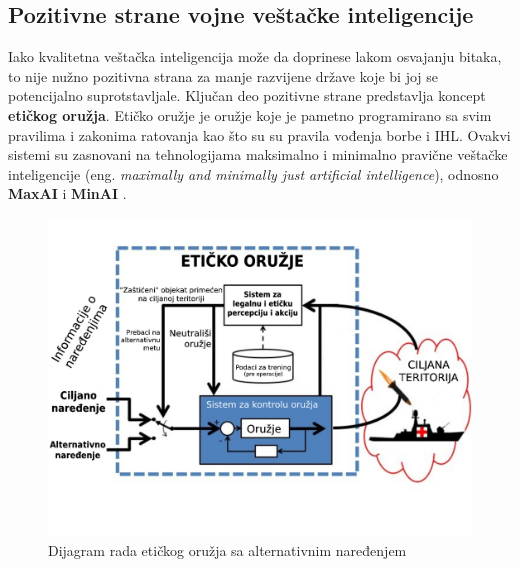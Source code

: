 \documentclass[a4paper]{article}
\begin{document}
\subsection{Pozitivne strane vojne veštačke inteligencije}
\label{subsec: Pozitivne strane vojne veštačke inteligencije}
Iako kvalitetna veštačka inteligencija može da doprinese lakom osvajanju bitaka, to nije nužno pozitivna strana za manje razvijene države koje bi joj se potencijalno suprotstavljale. Ključan deo pozitivne strane predstavlja koncept \textbf{etičkog oružja}. Etičko oružje je oružje koje je pametno programirano sa svim pravilima i zakonima ratovanja kao što su su pravila vođenja borbe i IHL. Ovakvi sistemi su zasnovani na tehnologijama maksimalno i minimalno pravične veštačke inteligencije (eng. \textit{maximally and minimally just artificial intelligence}), odnosno \textbf{MaxAI} i \textbf{MinAI} \cite[Chapter 36]{oxford_knjiga}.
\begin{figure}[h!]
\begin{center}
\includegraphics[scale=0.18]{minAi_new.jpg}
\end{center}
\caption{Dijagram rada etičkog oružja sa alternativnim naređenjem} 
\label{fig:minAI}
\end{figure} 
\end{document}
